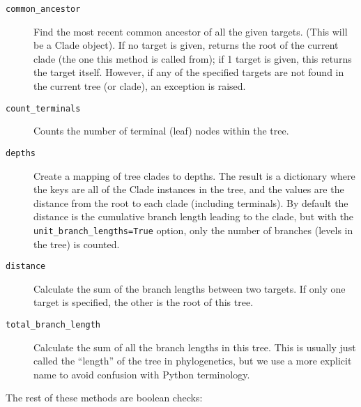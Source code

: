 \documentclass{report}
\begin{document}
\begin{description}
  \item[\texttt{common\_ancestor}]
    Find the most recent common ancestor of all the given targets. (This will be a Clade object). 
    If no target is given, returns the root of the current clade (the one this method is called
    from); if 1 target is given, this returns the target itself.  However, if any of the
    specified targets are not found in the current tree (or clade), an exception is raised.

  \item[\texttt{count\_terminals}]
    Counts the number of terminal (leaf) nodes within the tree.

  \item[\texttt{depths}]
    Create a mapping of tree clades to depths. The result is a dictionary where the keys are
    all of the Clade instances in the tree, and the values are the distance from the root to
    each clade (including terminals). By default the distance is the cumulative branch length
    leading to the clade, but with the \verb|unit_branch_lengths=True| option, only the number
    of branches (levels in the tree) is counted.

  \item[\texttt{distance}]
    Calculate the sum of the branch lengths between two targets.  If only one target is
    specified, the other is the root of this tree.

  \item[\texttt{total\_branch\_length}]
    Calculate the sum of all the branch lengths in this tree. This is usually just called the
    ``length'' of the tree in phylogenetics, but we use a more explicit name to avoid confusion
    with Python terminology.

\end{description}

The rest of these methods are boolean checks:
\end{document}
